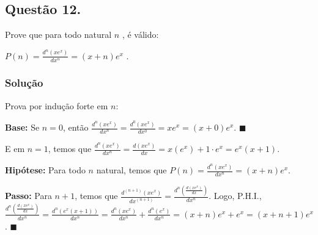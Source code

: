 \documentclass[12pt, letterpaper]{report}
\newcommand*{\CQD}{\hfill\ensuremath{\blacksquare}}%
\newcounter{ProblemNum}
\newcommand*{\anyproblem}[1]{\newpage\subsection*{#1}}
\newcommand*{\problem}[1]{\stepcounter{ProblemNum} %
   \anyproblem{Questão #1}}
\newcommand*{\soln}[1]{\subsubsection*{#1}}
\newcommand*{\solution}{\soln{Solução}}
\begin{document}
\problem{12.}
    Prove que para todo natural $ n $ , é válido:

    $  P(n) = \frac{d^n (xe^x)}{dx^n} = (x + n)e^x $ .

\solution
    Prova por indução forte em $n$:

    \textbf{Base:} Se $n = 0$, então $\frac{d^n (xe^x)}{dx^n} = \frac{d^0(xe^x)}{dx^0} = xe^x = (x + 0)e^x$. \CQD

    E em $n = 1$, temos que $\frac{d^n (xe^x)}{dx^n} = \frac{d(xe^x)}{dx} = x(e^x) + 1 \cdot e^x = e^x(x + 1)$.

    \textbf{Hipótese:} Para todo $n$ natural, temos que $  P(n) = \frac{d^n (xe^x)}{dx^n} = (x + n)e^x $.
    
    \textbf{Passo:} Para $n + 1$, temos que $\frac{d^{(n + 1)} (xe^x)}{dx^{(n + 1)}} = \frac{d^n (\frac{d(xe^x)}{dx})}{dx^n}$. Logo, P.H.I., $\frac{d^n (\frac{d(xe^x)}{dx})}{dx^n} = \frac{d^n (e^x(x + 1))}{dx^n} = 
    \frac{d^n (xe^x)}{dx^n} + \frac{d^n (e^x)}{dx^n} = (x + n)e^x + e^x = (x + n + 1)e^x$. \CQD
\end{document}
